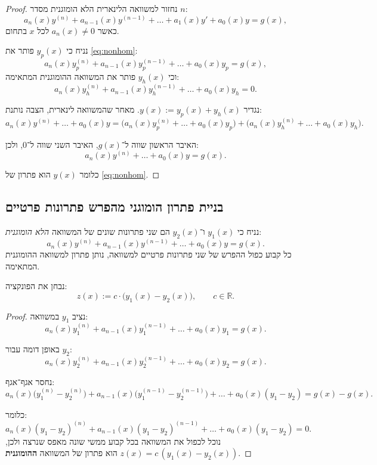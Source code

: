 \documentclass{article}
\numberwithin{equation}{section}
\begin{document}
\begin{proof}
נחזור למשוואה הלינארית הלא הומוגנית מסדר $n$:
\begin{equation}\label{eq:nonhom}
a_n(x)y^{(n)} + a_{n-1}(x)y^{(n-1)} + \dots + a_1(x)y' + a_0(x)y = g(x),
\end{equation}
כאשר $a_n(x)\neq 0$ לכל $x$ בתחום.
 
נניח כי $y_p(x)$ פותר את \eqref{eq:nonhom}:
\[
a_n(x)y_p^{(n)} + a_{n-1}(x)y_p^{(n-1)} + \dots + a_0(x)y_p = g(x),
\]
וכי $y_h(x)$ פותר את המשוואה ההומוגנית המתאימה:
\begin{equation}\label{eq:hom}
a_n(x)y_h^{(n)} + a_{n-1}(x)y_h^{(n-1)} + \dots + a_0(x)y_h = 0.
\end{equation}

נגדיר $y(x) := y_p(x) + y_h(x)$.  
מאחר שהמשוואה לינארית, הצבה נותנת:
\[
a_n(x)y^{(n)} + \dots + a_0(x)y
= \big(a_n(x)y_p^{(n)} + \dots + a_0(x)y_p\big)
+ \big(a_n(x)y_h^{(n)} + \dots + a_0(x)y_h\big).
\]

האיבר הראשון שווה ל־$g(x)$, האיבר השני שווה ל־$0$, ולכן:
\[
a_n(x)y^{(n)} + \dots + a_0(x)y = g(x).
\]

כלומר $y(x)$ הוא פתרון של \eqref{eq:nonhom}.  
\end{proof}

\newpage
\subsection{בניית פתרון הומוגני מהפרש פתרונות פרטיים}

נניח כי $y_1(x)$ ו־$y_2(x)$ הם שני פתרונות שונים של המשוואה \emph{הלא הומוגנית}:
\[
a_n(x)y^{(n)} + a_{n-1}(x)y^{(n-1)} + \dots + a_0(x)y = g(x).
\]
כל קבוע כפול ההפרש של שני פתרונות פרטיים למשוואה, נותן פתרון למשוואה ההומוגנית המתאימה.

נבחן את הפונקציה:
\[
z(x) := c \cdot \big(y_1(x) - y_2(x)\big), \qquad c \in \mathbb{R}.
\]

\begin{proof}
נציב $y_1$ במשוואה:
\[
a_n(x)y_1^{(n)} + a_{n-1}(x)y_1^{(n-1)} + \dots + a_0(x)y_1 = g(x).
\]

באופן דומה עבור $y_2$:
\[
a_n(x)y_2^{(n)} + a_{n-1}(x)y_2^{(n-1)} + \dots + a_0(x)y_2 = g(x).
\]

נחסר אגף־אגף:
\[
a_n(x)\big(y_1^{(n)} - y_2^{(n)}\big) + a_{n-1}(x)\big(y_1^{(n-1)} - y_2^{(n-1)}\big) + \dots + a_0(x)(y_1-y_2) = g(x)-g(x).
\]

כלומר:
\[
a_n(x)(y_1-y_2)^{(n)} + a_{n-1}(x)(y_1-y_2)^{(n-1)} + \dots + a_0(x)(y_1-y_2) = 0.
\]
נוכל לכפול את המשוואה בכל קבוע ממשי שונה מאפס שנרצה ולכן, $z(x)=c\,(y_1(x)-y_2(x))$ הוא פתרון של המשוואה \textbf{ההומוגנית}.
\end{proof}
\end{document}
